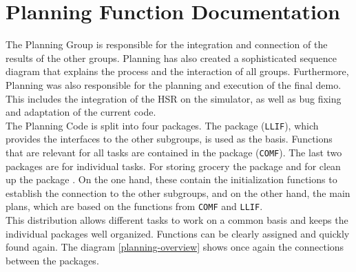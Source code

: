 \documentclass[main.tex]{subfiles}
\begin{document}
    \begingroup

    \renewcommand{\cleardoublepage}{}

    \renewcommand{\clearpage}{}
    
    \newpage

    \chapter{Planning Function Documentation}

        
        The Planning Group is responsible for the integration and connection of the results of the other groups. Planning has also created a sophisticated sequence diagram that explains the process and the interaction of all groups.
        Furthermore, Planning was also responsible for the planning and execution of the final demo. This includes the integration of the HSR on the simulator, as well as bug fixing and adaptation of the current code. \\
            
            The Planning Code is split into four packages. The package  (\texttt{LLIF}), which provides the interfaces to the other subgroups, is used as the basis. Functions that are relevant for all tasks are contained in the package  (\texttt{COMF}). The last two packages are for individual tasks. For storing grocery the package  and for clean up the package . On the one hand, these contain the initialization functions to establish the connection to the other subgroups, and on the other hand, the main plans, which are based on the functions from \texttt{COMF} and \texttt{LLIF}. \\
            This distribution allows different tasks to work on a common basis and keeps the individual packages well organized. Functions can be clearly assigned and quickly found again. The diagram \ref{planning-overview} shows once again the connections between the packages.
\end{document}
